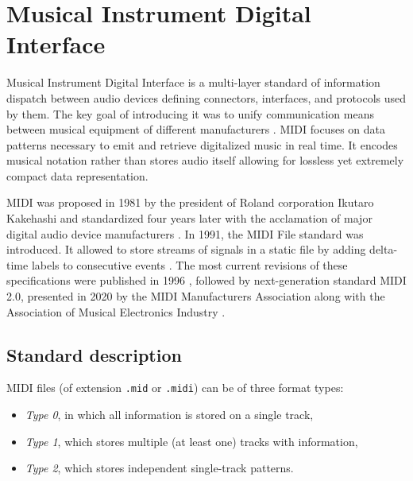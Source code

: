 \documentclass[a4paper, 11pt, twoside]{report}
\theoremstyle{definition}
\begin{document}
\section{Musical Instrument Digital Interface} \label{chapter:MIDI}

Musical Instrument Digital Interface is a multi-layer standard of information dispatch between audio devices defining connectors, interfaces, and protocols used by them. The key goal of introducing it was to unify communication means between musical equipment of different manufacturers \cite{MIDI_history}. MIDI focuses on data patterns necessary to emit and retrieve digitalized music in real time. It encodes musical notation rather than stores audio itself allowing for lossless yet extremely compact data representation. \par
MIDI was proposed in 1981 by the president of Roland corporation Ikutaro Kakehashi and standardized four years later with the acclamation of major digital audio device manufacturers \cite{MIDI_history}. In 1991, the MIDI File standard was introduced. It allowed to store streams of signals in a static file by adding delta-time labels to consecutive events \cite{MIDI1_file}. The most current revisions of these specifications were published in 1996 \cite{MIDI1_spec}, followed by next-generation standard MIDI 2.0, presented in 2020 by the MIDI Manufacturers Association along with the Association of Musical Electronics Industry \cite{MIDI2}. \par

\subsection{Standard description} \label{chapter:standard}

MIDI files (of extension \texttt{.mid} or \texttt{.midi}) can be of three format types:

\begin{itemize}
    \item \textit{Type 0}, in which all information is stored on a single track,
    \item \textit{Type 1}, which stores multiple (at least one) tracks with information,
    \item \textit{Type 2}, which stores independent single-track patterns.
\end{itemize} \par
\end{document}
